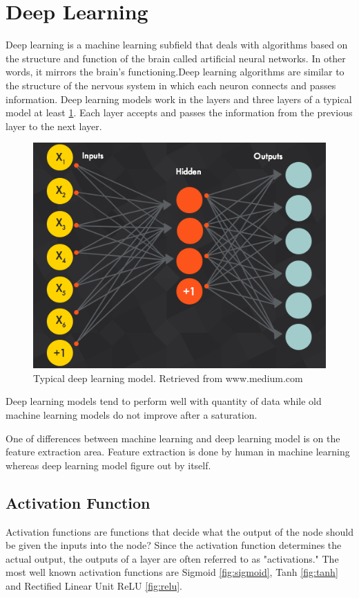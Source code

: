 \documentclass[12pt]{report}
\begin{document}
\clearpage
\section{Deep Learning}
    Deep learning is a machine learning subfield that deals with algorithms based 
    on the structure and function of the brain called artificial neural networks. 
    In other words, it mirrors the brain's functioning.Deep learning algorithms are similar to the structure of 
    the nervous system in which each neuron connects and passes information.
    Deep learning models work in the layers and three layers of a typical model at least \ref{fig:deep_learining}. 
    Each layer accepts and passes the information from the previous layer to the next layer.

    \begin{figure} [h]
        \centering
        \includegraphics[width=\textwidth]{./images/deep_learning.png}
        \caption{Typical deep learning model. Retrieved from www.medium.com}
        \label{fig:deep_learining}
    \end{figure}

    Deep learning models tend to perform well with quantity of data while old machine 
    learning models do not improve after a saturation.

    One of differences between machine learning and deep learning model is on the feature extraction area. 
    Feature extraction is done by human in machine learning whereas deep learning model figure out by itself.

    \subsection{Activation Function}
    Activation functions are functions that decide what the output of the node should be given the inputs into the node? 
    Since the activation function determines the actual output, the outputs of a layer are often referred to as "activations."
    The most well known activation functions are Sigmoid \ref{fig:sigmoid}, Tanh \ref{fig:tanh} and
    Rectified Linear Unit ReLU \ref{fig:relu}.
\end{document}
